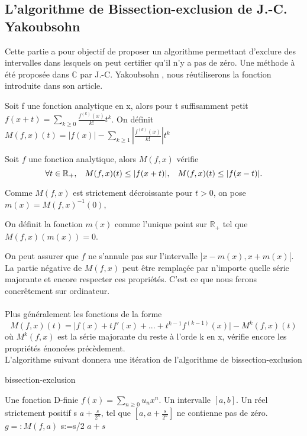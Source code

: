 \documentclass[a4paper,10.5pt]{article}
\begin{document}
	\subsection{L'algorithme de Bissection-exclusion de J.-C. Yakoubsohn}
	
	Cette partie a pour objectif de proposer un algorithme permettant d'exclure des intervalles dans lesquels on peut certifier qu'il n'y a pas de zéro. Une méthode à été proposée dans $\mathbb{C}$ par J.-C. Yakoubsohn \cite{DBLP:journals/jc/Yakoubsohn05}, nous réutiliserons la fonction introduite dans son article.
	
	\begin{definition}Soit f une fonction analytique en x, alors pour t suffisamment petit\\ $f(x+t)=\sum_{k\geq0} \frac{f^{(k)}(x)}{k!}t^{k}$. On définit $M(f,x)(t)=|f(x)|-\sum_{k\geq1}|\frac{f^{(k)}(x)}{k!}|t^{k}$
	\end{definition}
	\begin{proposition}
		Soit $f$ une fonction analytique, alors $M(f,x)$ vérifie 
		\[\forall t \in \mathbb{R}_+, \hspace{3mm} M(f,x)(t) \leq |f(x+t)|, \hspace{3mm} M(f,x)(t) \leq |f(x-t)|.\]
	\end{proposition}
	Comme $M(f,x)$ est strictement décroissante pour $t>0$, on pose $m(x)=M(f,x)^{-1}(0)$, 
	\begin{definition}
		On définit la fonction $m(x)$ comme l'unique point sur $\mathbb{R}_+$ tel que $M(f,x)(m(x))=0$.
	\end{definition} 
	On peut assurer que $f$ ne s'annule pas sur l'intervalle $]x-m(x),x+m(x)[$.
	La partie négative de $M(f,x)$ peut être remplaçée par n'importe quelle série majorante et encore respecter ces propriétés. C'est ce que nous ferons concrêtement sur ordinateur.\\
	\\
	Plus généralement les fonctions de la forme \[M(f,x)(t)=\big|f(x)+tf'(x)+...+t^{k-1}f^{(k-1)}(x)\big|-M^{k}(f,x)(t)\] où $M^{k}(f,x)$ est la série  majorante du reste à l'orde k en x, vérifie encore les propriétés énoncées précèdement.\\
	
	\noindent L'algorithme suivant donnera une itération de l'algorithme de bissection-exclusion 
	
	
	\begin{algorithm}
		\caption{bissection-exclusion}
		\begin{algorithmic}[1]
			\REQUIRE Une fonction D-finie $f(x)=\sum_{n \geq 0} u_nx^{n}$. Un intervalle $[a,b]$. Un réel strictement positif s
			\ENSURE $a+\frac{s}{2^n}$, tel que $[a,a+\frac{s}{2^n}]$ ne contienne pas de zéro.
			\STATE $g=:M(f,a)$
			\STATE s:=s/2
			\ENDWHILE
			\RETURN $a+s$
		\end{algorithmic}
		
	\end{algorithm}
	
\end{document}
